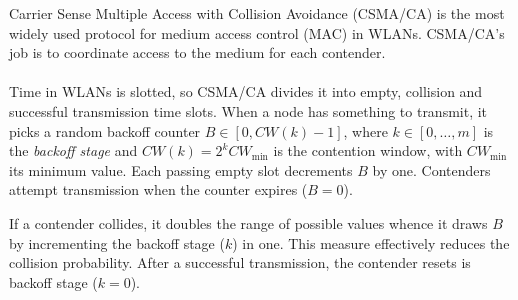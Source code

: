 \documentclass[portrait,a0paper]{baposter}
\begin{document}
\begin{poster}
{Carrier Sense Multiple Access with Collision Avoidance (CSMA/CA) is the most widely used protocol for medium access control (MAC) in WLANs. CSMA/CA's job is to coordinate access to the medium for each contender.
\\\\
Time in WLANs is slotted, so CSMA/CA divides it into empty, collision and successful transmission time slots. When a node has something to transmit, it picks a random backoff counter $B\in[0,CW(k)-1]$, where $k\in[0,\ldots,m]$ is the \emph{backoff stage} and $CW(k)=2^{k}CW_{\min}$ is the contention window, with $CW_{\min}$ its minimum value.
Each passing empty slot decrements $B$ by one. Contenders attempt transmission when the counter expires ($B=0$).


\begin{center}
\end{center}

If a contender collides, it doubles the range of possible values whence it draws $B$ by incrementing the backoff stage ($k$) in one. This measure effectively reduces the collision probability.
After a successful transmission, the contender resets is backoff stage ($k=0$).
}

\end{poster}
\end{document}
